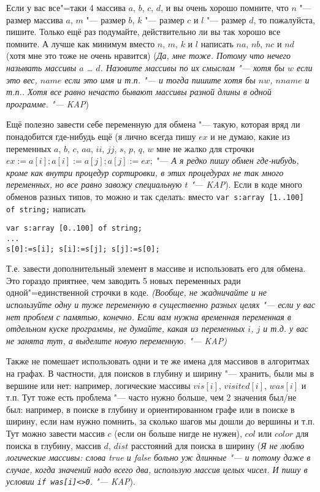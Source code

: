 Если у вас все"=таки 4 массива $a$, $b$, $c$, $d$, 
и вы очень хорошо помните, что $n$ "--- размер массива $a$, $m$ "--- размер $b$, $k$ "--- размер 
$c$ и $l$ "--- размер $d$, то пожалуйста, пишите. Только ещё раз подумайте, действительно ли вы так 
хорошо все помните. А лучше как минимум вместо $n$, $m$, $k$ и $l$ написать $na$, $nb$, $nc$ и $nd$ (хотя мне 
это тоже не очень нравится) (\textsl{Да, мне тоже. Потому что нечего называть массивы $a$ \dots{} 
$d$. Назовите массивы по их смыслам "--- хотя бы $w$ если это вес, $name$ если это имя и т.п. "--- 
и тогда пишите хотя бы $nw$, $nname$ и т.п.. Хотя все равно нечасто бывают массивы разной длины в одной программе. "--- 
KAP})

  Ещё полезно завести себе переменную для обмена "--- такую, которая вряд ли понадобится где-нибудь ещё 
(я лично всегда пишу $ex$ и не думаю, какие из переменных $a$, $b$, $c$, $aa$, $ii$, $jj$, $s$, 
$p$, $q$, $w$ мне не жалко для строчки $ex:=a[i]; a[i]:=a[j]; a[j]:=ex;$ "--- \textsl{А я редко 
пишу обмен где-нибудь, кроме как внутри процедур сортировки, в этих процедурах не так много 
переменных, но все равно завожу специальную $t$ "--- KAP}).
Если в коде много обменов разных типов, то можно и так сделать: вместо \texttt{var s:array [1..100] 
of string;} написать
\begin{codesampleo}\begin{verbatim}
var s:array [0..100] of string;
...
s[0]:=s[i]; s[i]:=s[j]; s[j]:=s[0];
\end{verbatim}
\end{codesampleo}
Т.е. завести дополнительный элемент в массиве и использовать его для обмена. Это гораздо приятнее, чем заводить 
5 новых переменных ради одной"=единственной строчки в коде. \textsl{(Вообще, не жадничайте и не используйте одну и туже переменную в существенно разных целях "--- если у вас нет проблем с памятью, конечно. Если вам нужна временная переменная в отдельном куске программы, не думайте, какая из переменных $i$, $j$ и т.д. у вас не занята тут, а выделите новую переменную. "--- KAP)}

Также не помешает использовать одни и те же имена для массивов в алгоритмах на графах. В частности, для поисков в глубину и 
ширину "--- хранить, были мы в вершине или нет: например, логические массивы $vis[i]$, 
$visited[i]$, $was[i]$ и т.п. Тут тоже есть проблема "--- часто нужно больше, чем 2 значения был/не 
был: например, в поиске в глубину и ориентированном графе или в поиске в ширину, если нам нужно 
помнить, за сколько шагов мы дошли до вершины и т.п. Тут можно завести массив $c$ (если он больше нигде не 
нужен), $col$ или $color$ для поиска в глубину, массив $d$, $dist$ расстояний для поиска в ширину 
(\textsl{Я не люблю логические массивы: слова true и false больно уж длинные "--- и потому даже в 
случае, когда значений надо всего два, использую массив целых чисел. И пишу в условии 
\texttt{if was[i]<>0}. "--- KAP}).

